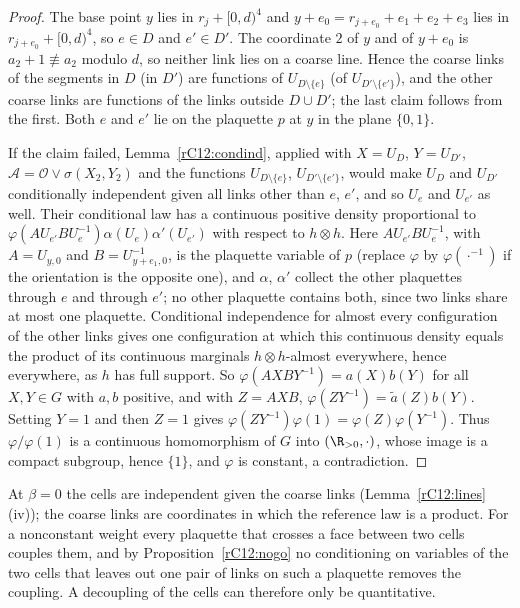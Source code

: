 \begin{proof}
The base point $y$ lies in $r_j+[0,d)^4$ and $y+e_0=r_{j+e_0}+e_1+e_2+e_3$
lies in $r_{j+e_0}+[0,d)^4$, so $e\in D$ and $e'\in D'$. The coordinate $2$
of $y$ and of $y+e_0$ is $a_2+1\not\equiv a_2$ modulo $d$, so neither link
lies on a coarse line. Hence the coarse links of the segments in $D$ (in
$D'$) are functions of $U_{D\setminus\{e\}}$ (of $U_{D'\setminus\{e'\}}$),
and the other coarse links are functions of the links outside $D\cup D'$;
the last claim follows from the first. Both $e$ and $e'$ lie on the
plaquette $p$ at $y$ in the plane $\{0,1\}$.

If the claim failed, Lemma~\ref{rC12:condind}, applied with $X=U_D$,
$Y=U_{D'}$, $\mathcal A=\mathcal O\vee\sigma(X_2,Y_2)$ and the functions
$U_{D\setminus\{e\}}$, $U_{D'\setminus\{e'\}}$, would make $U_D$ and $U_{D'}$
conditionally independent given all links other than $e$, $e'$, and so
$U_e$ and $U_{e'}$ as well. Their conditional law has a continuous positive
density proportional to $\varphi(AU_{e'}BU_e^{-1})\alpha(U_e)\alpha'(U_{e'})$
with respect to $h\otimes h$. Here $AU_{e'}BU_e^{-1}$, with $A=U_{y,0}$ and
$B=U_{y+e_1,0}^{-1}$, is the plaquette variable of $p$ (replace $\varphi$ by
$\varphi(\cdot^{-1})$ if the orientation is the opposite one), and $\alpha$,
$\alpha'$ collect the other plaquettes through $e$ and through $e'$; no
other plaquette contains both, since two links share at most one
plaquette. Conditional independence for almost every configuration of the
other links gives one configuration at which this continuous density equals
the product of its continuous marginals $h\otimes h$-almost everywhere,
hence everywhere, as $h$ has full support. So $\varphi(AXBY^{-1})=a(X)b(Y)$
for all $X,Y\in G$ with $a,b$ positive, and with $Z=AXB$,
$\varphi(ZY^{-1})=\tilde a(Z)b(Y)$. Setting $Y=1$ and then $Z=1$ gives
$\varphi(ZY^{-1})\varphi(1)=\varphi(Z)\varphi(Y^{-1})$. Thus $\varphi/
\varphi(1)$ is a continuous homomorphism of $G$ into $(\R_{>0},\cdot)$, whose
image is a compact subgroup, hence $\{1\}$, and $\varphi$ is constant, a
contradiction.
\end{proof}

At $\beta=0$ the cells are independent given the coarse links
(Lemma~\ref{rC12:lines}(iv)); the coarse links are coordinates in which the
reference law is a product. For a nonconstant weight every plaquette that
crosses a face between two cells couples them, and by
Proposition~\ref{rC12:nogo} no conditioning on variables of the two cells
that leaves out one pair of links on such a plaquette removes the coupling.
A decoupling of the cells can therefore only be quantitative.

